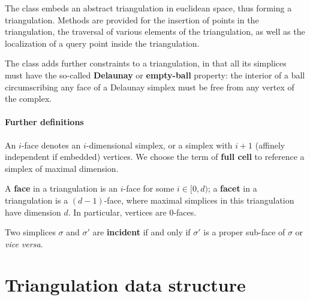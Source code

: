 {{The class  embeds an abstract
triangulation in euclidean space, thus forming a triangulation. Methods are
provided for the insertion %
of points in the triangulation, the
traversal of various elements of the triangulation, as well as the localization of a
query point inside the triangulation.

The class  adds further
constraints to a triangulation, in that all its simplices must have the
so-called \textbf{Delaunay} or \textbf{empty-ball} property: the interior of
a ball circumscribing any face of a Delaunay simplex must be free from any
vertex of the complex.



\paragraph{Further definitions}

An $i$-face denotes an $i$-dimensional simplex, or a simplex
with $i+1$ (affinely independent if embedded) vertices.
We choose the term of \textbf{full cell} to reference a simplex of maximal dimension.

A \textbf{face} in a triangulation is an $i$-face for some $i\in[0,d)$;
a \textbf{facet} in a triangulation is a $(d-1)$-face, where maximal simplices
in this triangulation have dimension $d$. In particular, vertices are
$0$-faces.

Two simplices $\sigma$ and $\sigma'$ are \textbf{incident} if and only if
$\sigma'$ is a proper sub-face of $\sigma$ or \emph{vice versa}.

\section{Triangulation data structure\label{triangulation:tds}}

\newcommand{\tds}{\ccc{TDS}}
\newcommand{\ad}{\ensuremath{D}}
\newcommand{\cd}{\ensuremath{d}}

}}
